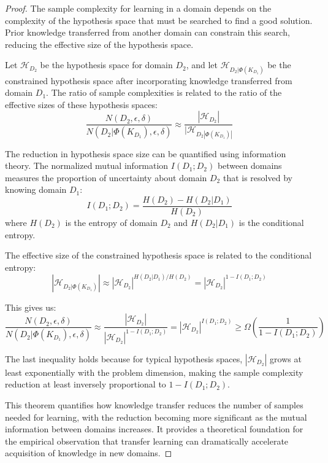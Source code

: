 \begin{proof}
The sample complexity for learning in a domain depends on the complexity of the hypothesis space that must be searched to find a good solution. Prior knowledge transferred from another domain can constrain this search, reducing the effective size of the hypothesis space.

Let $\mathcal{H}_{D_2}$ be the hypothesis space for domain $D_2$, and let $\mathcal{H}_{D_2 | \Phi(K_{D_1})}$ be the constrained hypothesis space after incorporating knowledge transferred from domain $D_1$. The ratio of sample complexities is related to the ratio of the effective sizes of these hypothesis spaces:
\begin{equation}
\frac{N(D_2, \epsilon, \delta)}{N(D_2 | \Phi(K_{D_1}), \epsilon, \delta)} \approx \frac{|\mathcal{H}_{D_2}|}{|\mathcal{H}_{D_2 | \Phi(K_{D_1})|}}
\end{equation}

The reduction in hypothesis space size can be quantified using information theory. The normalized mutual information $I(D_1; D_2)$ between domains measures the proportion of uncertainty about domain $D_2$ that is resolved by knowing domain $D_1$:
\begin{equation}
I(D_1; D_2) = \frac{H(D_2) - H(D_2 | D_1)}{H(D_2)}
\end{equation}
where $H(D_2)$ is the entropy of domain $D_2$ and $H(D_2 | D_1)$ is the conditional entropy.

The effective size of the constrained hypothesis space is related to the conditional entropy:
\begin{equation}
|\mathcal{H}_{D_2 | \Phi(K_{D_1})}| \approx |\mathcal{H}_{D_2}|^{H(D_2 | D_1) / H(D_2)} = |\mathcal{H}_{D_2}|^{1 - I(D_1; D_2)}
\end{equation}

This gives us:
\begin{equation}
\frac{N(D_2, \epsilon, \delta)}{N(D_2 | \Phi(K_{D_1}), \epsilon, \delta)} \approx \frac{|\mathcal{H}_{D_2}|}{|\mathcal{H}_{D_2}|^{1 - I(D_1; D_2)}} = |\mathcal{H}_{D_2}|^{I(D_1; D_2)} \geq \Omega\left(\frac{1}{1 - I(D_1; D_2)}\right)
\end{equation}

The last inequality holds because for typical hypothesis spaces, $|\mathcal{H}_{D_2}|$ grows at least exponentially with the problem dimension, making the sample complexity reduction at least inversely proportional to $1 - I(D_1; D_2)$.

This theorem quantifies how knowledge transfer reduces the number of samples needed for learning, with the reduction becoming more significant as the mutual information between domains increases. It provides a theoretical foundation for the empirical observation that transfer learning can dramatically accelerate acquisition of knowledge in new domains.
\end{proof}

